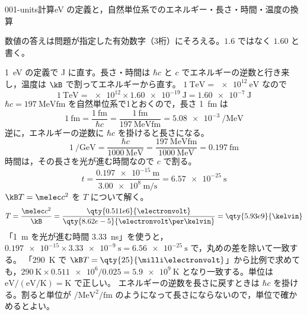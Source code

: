 \documentclass[uplatex,dvipdfmx,a4paper,11pt]{jsarticle}
\begin{document}
\begin{mondai}{001-units}{計算}{eV の定義と，自然単位系でのエネルギー・長さ・時間・温度の換算}
\begin{kizuki}
\item 数値の答えは問題が指定した有効数字（3桁）にそろえる。$1.6$ ではなく $1.60$ と書く。
\end{kizuki}
\begin{tadashii}
\houshin \qty{1}{\electronvolt} の定義で \unit{\joule} に直す。長さ・時間は $\hbar c$ と $c$ でエネルギーの逆数と行き来し，温度は $\kB$ で割ってエネルギーから直す。
\keisan {} $\qty{1}{\tera\electronvolt}=\qty{e12}{\electronvolt}$ なので
\[ \qty{1}{\tera\electronvolt}=\num{e12}\times\qty{1.60e-19}{\joule}=\qty{1.60e-7}{\joule} \]
 $\hbar c=\qty{197}{\mega\electronvolt\femto\metre}$ を自然単位系で1とおくので，長さ \qty{1}{\femto\metre} は
\[ \qty{1}{\femto\metre}=\frac{\qty{1}{\femto\metre}}{\hbar c}=\frac{\qty{1}{\femto\metre}}{\qty{197}{\mega\electronvolt\femto\metre}}=\qty{5.08e-3}{\per\mega\electronvolt} \]
逆に，エネルギーの逆数に $\hbar c$ を掛けると長さになる。
\[ \qty{1}{\per\giga\electronvolt}=\frac{\hbar c}{\qty{1000}{\mega\electronvolt}}=\frac{\qty{197}{\mega\electronvolt\femto\metre}}{\qty{1000}{\mega\electronvolt}}=\qty{0.197}{\femto\metre} \]
 時間は，その長さを光が進む時間なので $c$ で割る。
\[ t=\frac{\qty{0.197e-15}{\metre}}{\qty{3.00e8}{\metre\per\second}}=\qty{6.57e-25}{\second} \]
 $\kB T=\melec c^2$ を $T$ について解く。
\[ T=\frac{\melec c^2}{\kB}=\frac{\qty{0.511e6}{\electronvolt}}{\qty{8.62e-5}{\electronvolt\per\kelvin}}=\qty{5.93e9}{\kelvin} \]
\kenzan {} 「\qty{1}{\metre} を光が進む時間 \qty{3.33}{\nano\second}」を使うと，$\num{0.197e-15}\times\qty{3.33e-9}{\second}=\qty{6.56e-25}{\second}$ で，丸めの差を除いて一致する。 「\qty{290}{\kelvin} で $\kB T=\qty{25}{\milli\electronvolt}$」から比例で求めても，$\qty{290}{\kelvin}\times\num{0.511e6}/\num{0.025}=\qty{5.9e9}{\kelvin}$ となり一致する。単位は $\unit{\electronvolt}/(\unit{\electronvolt\per\kelvin})=\unit{\kelvin}$ で正しい。 %
\tsumazuki エネルギーの逆数を長さに戻すときは $\hbar c$ を掛ける。割ると単位が $\unit{\per\mega\electronvolt\squared\per\femto\metre}$ のようになって長さにならないので，単位で確かめるとよい。
\end{tadashii}
\end{mondai}
\end{document}
